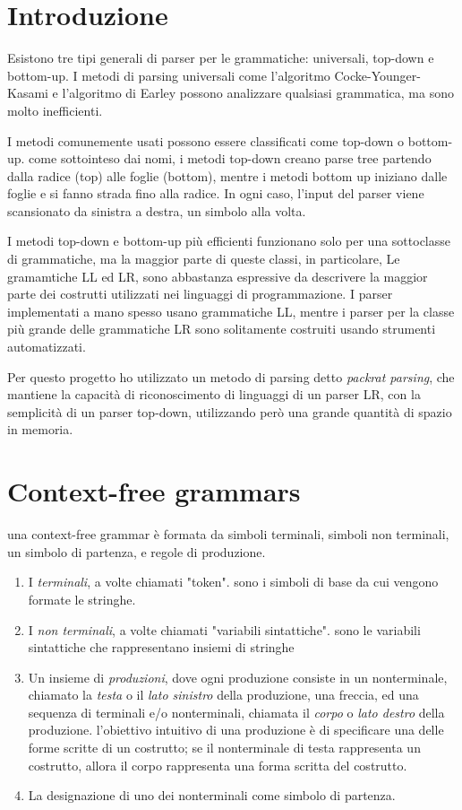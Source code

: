 \section{Introduzione}
Esistono tre tipi generali di parser per le grammatiche: universali, top-down e bottom-up. I metodi di parsing universali come l'algoritmo Cocke-Younger-Kasami e l'algoritmo di Earley possono analizzare qualsiasi grammatica, ma sono molto inefficienti.

I metodi comunemente usati possono essere classificati come top-down o bottom-up. come sottointeso dai nomi, i metodi top-down creano parse tree partendo dalla radice (top) alle foglie (bottom), mentre i metodi bottom up iniziano dalle foglie e si fanno strada fino alla radice. In ogni caso, l'input del parser viene scansionato da sinistra a destra, un simbolo alla volta.

I metodi top-down e bottom-up più efficienti funzionano solo per una sottoclasse di grammatiche, ma la maggior parte di queste classi, in particolare, Le gramamtiche LL ed LR, sono abbastanza espressive da descrivere la maggior parte dei costrutti utilizzati nei linguaggi di programmazione. I parser implementati a mano spesso usano grammatiche LL, mentre i parser per la classe più grande delle grammatiche LR sono solitamente costruiti usando strumenti automatizzati.\cite{compilers}

Per questo progetto ho utilizzato un metodo di parsing detto \textit{packrat parsing}, che mantiene la capacità di riconoscimento di linguaggi di un parser LR, con la semplicità di un parser top-down, utilizzando però una grande quantità di spazio in memoria.

\section{Context-free grammars}
una context-free grammar è formata da simboli terminali, simboli non terminali, un simbolo di partenza, e regole di produzione.\cite{compilers}
\begin{enumerate}
	\item I \textit{terminali}, a volte chiamati "token". sono i simboli di base da cui vengono formate le stringhe.
	\item I \textit{non terminali}, a volte chiamati "variabili sintattiche". sono le variabili sintattiche che rappresentano insiemi di stringhe
	\item Un insieme di \textit{produzioni}, dove ogni produzione consiste in un nonterminale, chiamato la \textit{testa} o il   \textit{lato sinistro} della produzione, una freccia, ed una sequenza di terminali e/o nonterminali, chiamata il \textit{corpo} o \textit{lato destro} della produzione. l'obiettivo intuitivo di una produzione è di specificare una delle forme scritte  di un costrutto; se il nonterminale di testa rappresenta un costrutto, allora il corpo rappresenta una forma scritta del costrutto.
	\item La designazione di uno dei nonterminali come simbolo di partenza.
\end{enumerate}

